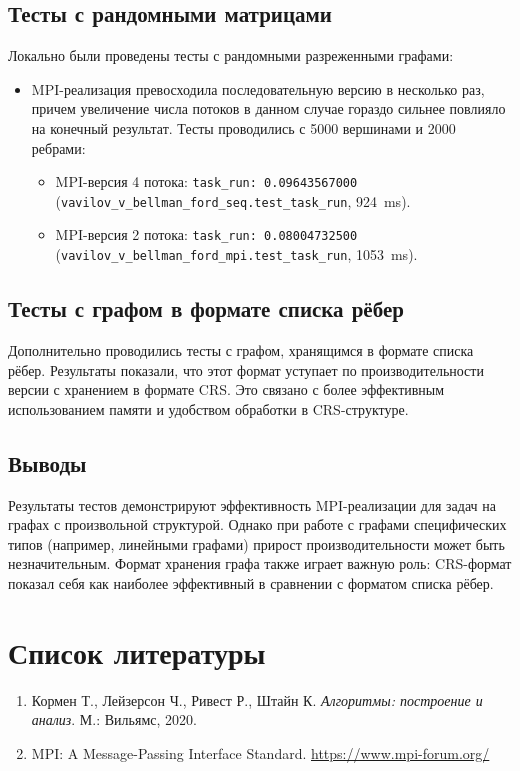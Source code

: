 \documentclass[12pt]{article}
\begin{document}
\subsection{Тесты с рандомными матрицами}

Локально были проведены тесты с рандомными разреженными графами:
\begin{itemize}
    \item MPI-реализация превосходила последовательную версию в несколько раз, причем увеличение числа потоков в данном случае гораздо сильнее повлияло на конечный результат. Тесты проводились с 5000 вершинами и 2000 ребрами:
    \begin{itemize}
        \item MPI-версия 4 потока: \texttt{task\_run: 0.09643567000}\\ (\texttt{vavilov\_v\_bellman\_ford\_seq.test\_task\_run}, 924~ms).
        \item MPI-версия 2 потока: \texttt{task\_run: 0.08004732500}\\ (\texttt{vavilov\_v\_bellman\_ford\_mpi.test\_task\_run}, 1053~ms).
    \end{itemize}
    
\end{itemize}

\subsection{Тесты с графом в формате списка рёбер}

Дополнительно проводились тесты с графом, хранящимся в формате списка рёбер. Результаты показали, что этот формат уступает по производительности версии с хранением в формате CRS. Это связано с более эффективным использованием памяти и удобством обработки в CRS-структуре.

\subsection{Выводы}

Результаты тестов демонстрируют эффективность MPI-реализации для задач на графах с произвольной структурой. Однако при работе с графами специфических типов (например, линейными графами) прирост производительности может быть незначительным. Формат хранения графа также играет важную роль: CRS-формат показал себя как наиболее эффективный в сравнении с форматом списка рёбер.

\section{Список литературы}
\begin{enumerate}
\item Кормен Т., Лейзерсон Ч., Ривест Р., Штайн К. \textit{Алгоритмы: построение и анализ}. \newline М.: Вильямс, 2020.
\item MPI: A Message-Passing Interface Standard. \url{https://www.mpi-forum.org/}
\end{enumerate}
\end{document}

